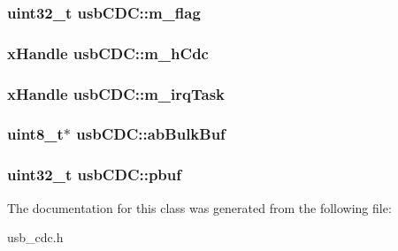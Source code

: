 \hypertarget{classusb_c_d_c_a65b3a5365936dd08f69243e9d433d132}{
\subsubsection[{m\-\_\-flag}]{\setlength{\rightskip}{0pt plus 5cm}uint32\-\_\-t usb\-C\-D\-C\-::m\-\_\-flag}}\label{classusb_c_d_c_a65b3a5365936dd08f69243e9d433d132}
\hypertarget{classusb_c_d_c_a3e75d771150245f193312bd7bc8e6c6c}{
\subsubsection[{m\-\_\-h\-Cdc}]{\setlength{\rightskip}{0pt plus 5cm}x\-Handle usb\-C\-D\-C\-::m\-\_\-h\-Cdc\hspace{0.3cm}{\ttfamily [protected]}}}\label{classusb_c_d_c_a3e75d771150245f193312bd7bc8e6c6c}
\hypertarget{classusb_c_d_c_a9dd6cfe134ba6032c33b1f37b5260c73}{
\subsubsection[{m\-\_\-irq\-Task}]{\setlength{\rightskip}{0pt plus 5cm}x\-Handle usb\-C\-D\-C\-::m\-\_\-irq\-Task\hspace{0.3cm}{\ttfamily [protected]}}}\label{classusb_c_d_c_a9dd6cfe134ba6032c33b1f37b5260c73}
\hypertarget{classusb_c_d_c_a6e7ef41e22502fc36c48311c8654bc37}{
\subsubsection[{ab\-Bulk\-Buf}]{\setlength{\rightskip}{0pt plus 5cm}uint8\-\_\-t$\ast$ usb\-C\-D\-C\-::ab\-Bulk\-Buf\hspace{0.3cm}{\ttfamily [protected]}}}\label{classusb_c_d_c_a6e7ef41e22502fc36c48311c8654bc37}
\hypertarget{classusb_c_d_c_a4a1f881b570687525bb133ef2edfd8ae}{
\subsubsection[{pbuf}]{\setlength{\rightskip}{0pt plus 5cm}uint32\-\_\-t usb\-C\-D\-C\-::pbuf\hspace{0.3cm}{\ttfamily [protected]}}}\label{classusb_c_d_c_a4a1f881b570687525bb133ef2edfd8ae}


The documentation for this class was generated from the following file\-:\begin{DoxyCompactItemize}
\item 
usb\-\_\-cdc.\-h\end{DoxyCompactItemize}
